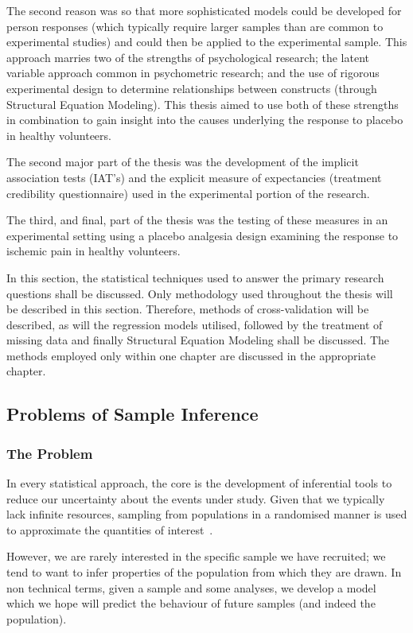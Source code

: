 The second reason was so that more sophisticated models could be developed for person responses (which typically require larger samples than are common to experimental studies) and could then be applied to the experimental sample. This approach marries two of the strengths of psychological research; the latent variable approach common in psychometric research; and  the use of rigorous experimental design to determine relationships between constructs (through Structural Equation Modeling). This thesis aimed to use both of these strengths in combination to gain insight into the causes underlying the response to placebo in healthy volunteers.

The second major part of the thesis was the development of the implicit association tests (IAT's) and the explicit measure of expectancies (treatment credibility questionnaire) used in the experimental portion of the research. 

The third, and final, part of the thesis was the testing of these measures in an experimental setting using a placebo analgesia design examining the response to ischemic pain in healthy volunteers. 


In this section, the statistical techniques used to answer the primary research questions shall be discussed. Only methodology used throughout the thesis will be described in this section. Therefore, methods of cross-validation will be described, as will the regression models utilised, followed by the treatment of missing data and finally Structural Equation Modeling shall be discussed. The methods employed only within one chapter are discussed in the appropriate chapter. 

\subsection{Problems of Sample Inference}
\label{sec:probl-sample-infer}
\subsubsection{The Problem}

In every statistical approach, the core is the development of inferential tools to reduce our uncertainty about the events under study\cite{gelman2010philosophy}. Given that we typically lack infinite resources, sampling from populations in a randomised manner is used to approximate the quantities of interest~\cite{venables2002modern}.

However, we are rarely interested in the specific sample we have recruited; we tend to want to infer properties of the population  from which they are drawn.  In non technical terms, given a sample and some analyses, we develop a model which we hope will predict the behaviour of future samples (and indeed the population).

